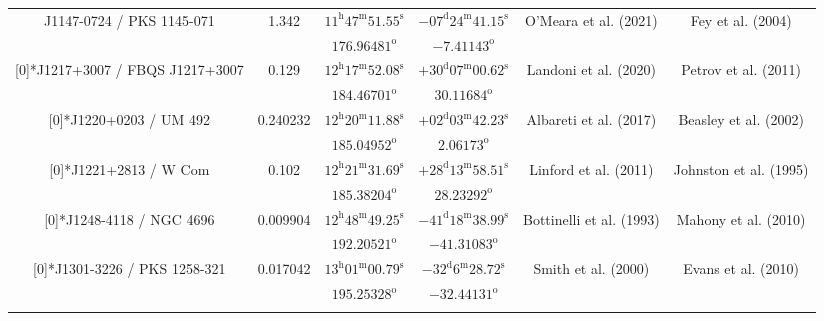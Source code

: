\begin{landscape}
\begin{longtable}{cccccc}
   \multirow{2}[0]{*}{J1147-0724 / PKS 1145-071} & \multirow{2}[0]{*}{1.342} &  
    $11^\text{h}47^\text{m}51.55^\text{s}$  & $-07^\text{d}24^\text{m}41.15^\text{s}$  & 
    \multirow{2}[0]{*}{O'Meara et al. (2021)\cite{RedRef47_2021}}& \multirow{2}[0]{*}{Fey et al. (2004)\cite{CoordRef2_2004}} \\*
    & & $176.96481^\text{o}$ & $-7.41143^\text{o}$ & & \\ \addlinespace 

 \multirow{2}[0]{*}{J1217+3007 / FBQS J1217+3007} & \multirow{2}[0]{*}{0.129} &  
    $12^\text{h}17^\text{m}52.08^\text{s}$  & $+30^\text{d}07^\text{m}00.62^\text{s}$  & 
    \multirow{2}[0]{*}{Landoni et al. (2020)\cite{RedRef48_2020}}& \multirow{2}[0]{*}{Petrov et al. (2011) \cite{CoordRef31_2011}} \\*
    & & $184.46701^\text{o}$ & $30.11684^\text{o}$ & & \\ \addlinespace 

 \multirow{2}[0]{*}{J1220+0203 / UM 492} & \multirow{2}[0]{*}{0.240232} &  
    $12^\text{h}20^\text{m}11.88^\text{s}$  & $+02^\text{d}03^\text{m}42.23^\text{s}$  & 
    \multirow{2}[0]{*}{Albareti et al. (2017) \cite{RedRef9_2017}}& \multirow{2}[0]{*}{Beasley et al. (2002)\cite{CoordRef4_2002}} \\*
    & & $185.04952^\text{o}$ & $2.06173^\text{o}$ & & \\ \addlinespace 

  \multirow{2}[0]{*}{J1221+2813 / W Com} & \multirow{2}[0]{*}{0.102} &  
    $12^\text{h}21^\text{m}31.69^\text{s}$  & $+28^\text{d}13^\text{m}58.51^\text{s}$  & 
    \multirow{2}[0]{*}{Linford et al. (2011) \cite{RedRef50_2011}}& \multirow{2}[0]{*}{Johnston et al. (1995)\cite{CoordRef0_1995}} \\*
    & & $185.38204^\text{o}$ & $28.23292^\text{o}$ & & \\ \addlinespace 
  \multirow{2}[0]{*}{J1248-4118 / NGC 4696} & \multirow{2}[0]{*}{0.009904} &  
    $12^\text{h}48^\text{m}49.25^\text{s}$  & $-41^\text{d}18^\text{m}38.99^\text{s}$  & 
    \multirow{2}[0]{*}{Bottinelli et al. (1993)\cite{RedRef1_1993}}& \multirow{2}[0]{*}{Mahony et al. (2010)\cite{CoordRef51_2010}} \\*
    & & $192.20521^\text{o}$ & $-41.31083^\text{o}$ & & \\ \addlinespace 

  \multirow{2}[0]{*}{J1301-3226 / PKS 1258-321} & \multirow{2}[0]{*}{0.017042} &  
    $13^\text{h}01^\text{m}00.79^\text{s}$  & $-32^\text{d}6^\text{m}28.72^\text{s}$  & 
    \multirow{2}[0]{*}{Smith et al. (2000)\cite{RedRef52_2000}}& \multirow{2}[0]{*}{Evans et al. (2010)\cite{CoordRef1_2010}} \\*
    & & $195.25328^\text{o}$ & $-32.44131^\text{o}$ & & \\ \addlinespace 


\end{longtable}
\end{landscape}
